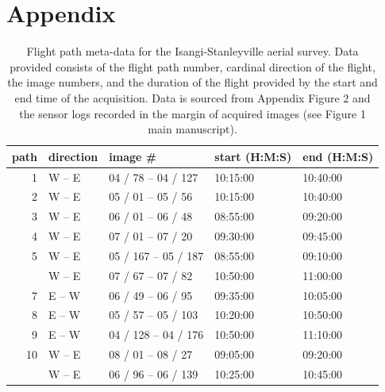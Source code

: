 \documentclass[landscape]{article}
\title{}
\author{}
\date{}
\begin{document}
\hypertarget{appendix}{%
\section{Appendix}\label{appendix}}

\begin{table}[!h]

\caption{\label{tab:unnamed-chunk-1}Flight path meta-data for the Isangi-Stanleyville aerial survey. Data provided consists of the flight path number, cardinal direction of the flight, the image numbers, and the duration of the flight provided by the start and end time of the acquisition. Data is sourced from Appendix Figure 2 and the sensor logs recorded in the margin of acquired images (see Figure 1 main manuscript).}
\centering
\begin{tabular}[t]{rllll}
\toprule
path & direction & image \# & start (H:M:S) & end (H:M:S)\\
\midrule
1 & W – E & 04 / 78 – 04 / 127 & 10:15:00 & 10:40:00\\
2 & W – E & 05 / 01 – 05 / 56 & 10:15:00 & 10:40:00\\
3 & W – E & 06 / 01 – 06 / 48 & 08:55:00 & 09:20:00\\
4 & W – E & 07 / 01 – 07 / 20 & 09:30:00 & 09:45:00\\
5 & W – E & 05 / 167 – 05 / 187 & 08:55:00 & 09:10:00\\
\addlinespace
6 & W – E & 07 / 67 – 07 / 82 & 10:50:00 & 11:00:00\\
7 & E – W & 06 / 49 – 06 / 95 & 09:35:00 & 10:05:00\\
8 & E – W & 05 / 57 – 05 / 103 & 10:20:00 & 10:50:00\\
9 & E – W & 04 / 128 – 04 / 176 & 10:50:00 & 11:10:00\\
10 & W – E & 08 / 01 – 08 / 27 & 09:05:00 & 09:20:00\\
\addlinespace
11 & W – E & 06 / 96 – 06 / 139 & 10:25:00 & 10:45:00\\
\bottomrule
\end{tabular}
\end{table}
\end{document}
